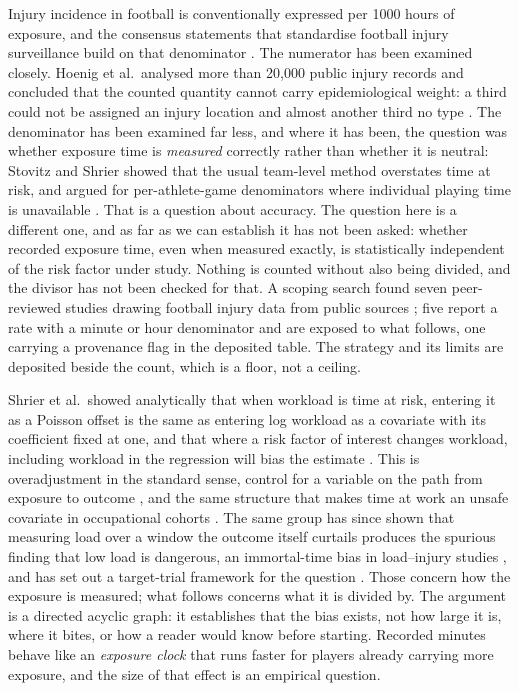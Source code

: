 \documentclass[11pt]{article}
\begin{document}
Injury incidence in football is conventionally expressed per 1000 hours of exposure, and the consensus statements that standardise football injury surveillance build on that denominator \cite{bahr2020ioc,walden2023_football_consensus}. The numerator has been examined closely. Hoenig et al.\ analysed more than 20,000 public injury records and concluded that the counted quantity cannot carry epidemiological weight: a third could not be assigned an injury location and almost another third no type \cite{hoenig2022citizen_transfermarkt}. The denominator has been examined far less, and where it has been, the question was whether exposure time is \emph{measured} correctly rather than whether it is neutral: Stovitz and Shrier showed that the usual team-level method overstates time at risk, and argued for per-athlete-game denominators where individual playing time is unavailable \cite{stovitz2012_exposure_time}. That is a question about accuracy. The question here is a different one, and as far as we can establish it has not been asked: whether recorded exposure time, even when measured exactly, is statistically independent of the risk factor under study. Nothing is counted without also being divided, and the divisor has not been checked for that. A scoping search found seven peer-reviewed studies drawing football injury data from public sources \cite{szymski2023bundesliga_media,wilke2022_media_muscle,krutsch2021_bundesliga_restart,palmer2023_english_case_series,ortiz2026_acl_top_five,dambrosi2026_rtp_acl,hoenig2022citizen_transfermarkt}; five report a rate with a minute or hour denominator and are exposed to what follows, one carrying a provenance flag in the deposited table. The strategy and its limits are deposited beside the count, which is a floor, not a ceiling.

Shrier et al.\ showed analytically that when workload is time at risk, entering it as a Poisson offset is the same as entering log workload as a covariate with its coefficient fixed at one, and that where a risk factor of interest changes workload, including workload in the regression will bias the estimate \cite{shrier2022_causal_workload}. This is overadjustment in the standard sense, control for a variable on the path from exposure to outcome \cite{schisterman2009_overadjustment}, and the same structure that makes time at work an unsafe covariate in occupational cohorts \cite{naimi2013_healthy_worker,yu2026_load_management}. The same group has since shown that measuring load over a window the outcome itself curtails produces the spurious finding that low load is dangerous, an immortal-time bias in load--injury studies \cite{wang2024_immortal_time_load}, and has set out a target-trial framework for the question \cite{wang2024_target_trial}. Those concern how the exposure is measured; what follows concerns what it is divided by. The argument is a directed acyclic graph: it establishes that the bias exists, not how large it is, where it bites, or how a reader would know before starting. Recorded minutes behave like an \emph{exposure clock} that runs faster for players already carrying more exposure, and the size of that effect is an empirical question.
\end{document}
